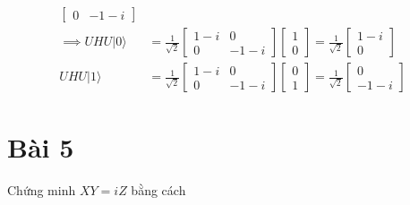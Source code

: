 \begin{align*}
\begin{bmatrix}
                                                    0     & -1 - i
                                                \end{bmatrix}    \\
    \implies UHU|0\rangle & = \frac{1}{\sqrt{2}}\begin{bmatrix}
                                                    1 - i & 0      \\
                                                    0     & -1 - i
                                                \end{bmatrix}
    \begin{bmatrix}
        1 \\
        0
    \end{bmatrix}
    = \frac{1}{\sqrt{2}}\begin{bmatrix}
                            1 - i \\
                            0
                        \end{bmatrix}                            \\
    UHU|1\rangle          & = \frac{1}{\sqrt{2}}
    \begin{bmatrix}
        1 - i & 0      \\
        0     & -1 - i
    \end{bmatrix}
    \begin{bmatrix}
        0 \\
        1
    \end{bmatrix}
    = \frac{1}{\sqrt{2}}\begin{bmatrix}
                            0 \\
                            -1 - i
                        \end{bmatrix}
\end{align*}

\section{Bài 5}
Chứng minh $XY=iZ$ bằng cách

